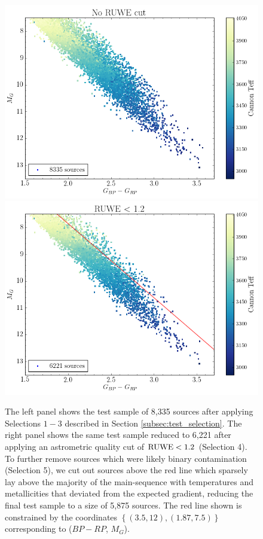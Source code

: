 \documentclass[twocolumn]{aastex62}
\begin{document}
\begin{figure}
\begin{center}
	\includegraphics[width=\linewidth]{figures/ruwe_cut_before.png} \\
	\includegraphics[width=\linewidth]{figures/ruwe_cut_after.png}
	\caption{The left panel shows the test sample of 8,335 sources after applying Selections $1-3$ described in Section \ref{subsec:test_selection}. The right panel shows the same test sample reduced to 6,221 after applying an astrometric quality cut of ${\rm RUWE}<1.2$ (Selection 4). To further remove sources which were likely binary contamination (Selection 5), we cut out sources above the red line which sparsely lay above the majority of the main-sequence with temperatures and metallicities that deviated from the expected gradient, reducing the final test sample to a size of 5,875 sources. The red line shown is constrained by the coordinates $\left\{ (3.5,12), (1.87,7.5) \right\}$ corresponding to ($BP-RP$, $M_G$).}
	\label{fig:ruwe_cut}
\end{center}
\end{figure}
\end{document}
